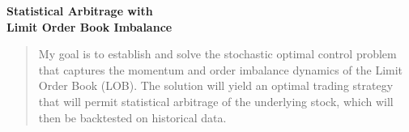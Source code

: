 \documentclass[12pt]{article}
\begin{document}
\mymascheader
\pagestyle{plain}
{\begin{center} {\large {\bf Statistical Arbitrage with \\  Limit Order Book Imbalance}} \end{center}}
\bigskip


\begin{quote}
My goal is to establish and solve the stochastic optimal control problem that 
captures the momentum and order imbalance dynamics of the Limit Order Book 
(LOB). The solution will yield an optimal trading strategy that will permit
statistical arbitrage of the underlying stock, which will then be backtested on
historical data.
\end{quote}
\end{document}
